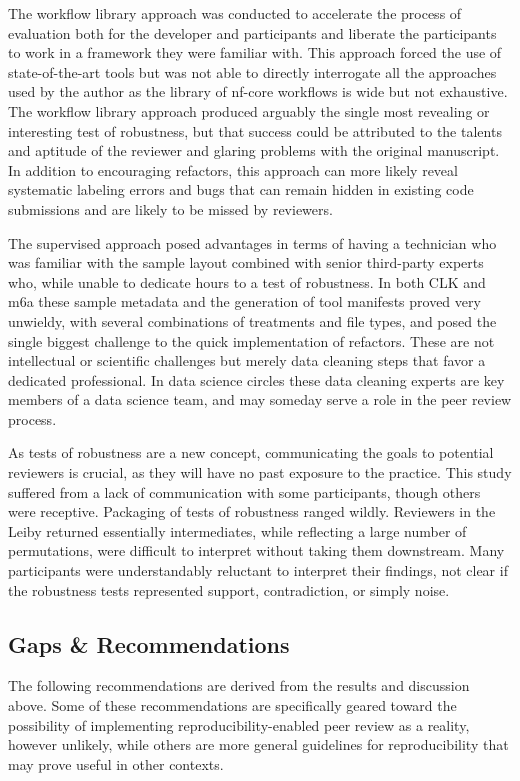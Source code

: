 \documentclass{drexelthesis}
\begin{document}
The workflow library approach was conducted to accelerate the process of evaluation both for the developer and participants and liberate the participants to work in a framework they were familiar with. This approach forced the use of state-of-the-art tools but was not able to directly interrogate all the approaches used by the author as the library of nf-core workflows is wide but not exhaustive. The workflow library approach produced arguably the single most revealing or interesting test of robustness, but that success could be attributed to the talents and aptitude of the reviewer and glaring problems with the original manuscript. In addition to encouraging refactors, this approach can more likely reveal systematic labeling errors and bugs that can remain hidden in existing code submissions and are likely to be missed by reviewers.

The supervised approach posed advantages in terms of having a technician who was familiar with the sample layout combined with senior third-party experts who, while unable to dedicate hours to a test of robustness. In both CLK and m6a these sample metadata and the generation of tool manifests proved very unwieldy, with several combinations of treatments and file types, and posed the single biggest challenge to the quick implementation of refactors. These are not intellectual or scientific challenges but merely data cleaning steps that favor a dedicated professional. In data science circles these data cleaning experts are key members of a data science team, and may someday serve a role in the peer review process.

As tests of robustness are a new concept, communicating the goals to potential reviewers is crucial, as they will have no past exposure to the practice. This study suffered from a lack of communication with some participants, though others were receptive. Packaging of tests of robustness ranged wildly. Reviewers in the Leiby returned essentially intermediates, while reflecting a large number of permutations, were difficult to interpret without taking them downstream. Many participants were understandably reluctant to interpret their findings, not clear if the robustness tests represented support, contradiction, or simply noise.

\subsection{Gaps \& Recommendations}

The following recommendations are derived from the results and discussion above. Some of these recommendations are specifically geared toward the possibility of implementing reproducibility-enabled peer review as a reality, however unlikely, while others are more general guidelines for reproducibility that may prove useful in other contexts.
\end{document}
